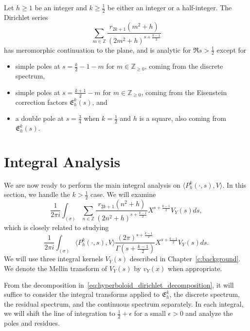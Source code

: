 \begin{theorem}\label{thm:hyperboloid:mero_summary}
  Let $h \geq 1$ be an integer and $k \geq \frac{1}{2}$ be either an integer or a
  half-integer.
  The Dirichlet series
  \begin{equation}
    \sum_{m \in \mathbb{Z}} \frac{r_{2k+1}(m^2 + h)}{(2m^2 + h)^{s + \frac{k-1}{2}}}
  \end{equation}
  has meromorphic continuation to the plane, and is analytic for $\Re s > \frac{1}{2}$
  except for
  \begin{itemize}
    \item simple poles at $s = \frac{k}{2} - 1 - m$ for $m \in \mathbb{Z}_{\geq 0}$,
      coming from the discrete spectrum,
    \item simple poles at $s = \frac{k+1}{2} - m$ for $m \in \mathbb{Z}_{\geq 0}$, coming
      from the Eisenstein correction factors $\mathfrak{E}_h^k(s)$, and
    \item a double pole at $s = \frac{3}{4}$ when $k = \frac{1}{2}$ and $h$ is a square,
      also coming from $\mathfrak{E}_h^k(s)$.
  \end{itemize}
\end{theorem}



\section{Integral Analysis}\label{sec:hyp:integral_analysis}

We are now ready to perform the main integral analysis on $\langle P_h^k(\cdot, s),
V\rangle$.
In this section, we handle the $k > \frac{1}{2}$ case.
We will examine
\begin{equation}
  \frac{1}{2\pi i} \int_{(\sigma)} \sum_{n \in \mathbb{Z}} \frac{r_{2k+1}(n^2 + h)}{(2n^2 +
  h)^{s + \frac{k-1}{2}}} X^{s+\frac{k-1}{2}} V_Y(s) ds,
\end{equation}
which is closely related to studying
\begin{equation}
  \frac{1}{2\pi i} \int_{(\sigma)} \langle P_h^k(\cdot, s), V \rangle \frac{(2\pi)^{s +
  \frac{k-1}{2}}}{\Gamma(s + \frac{k-1}{2})} X^{s+\frac{k-1}{2}} V_Y(s) ds.
\end{equation}
We will use three integral kernels $V_Y(s)$ described in Chapter~\ref{c:background}.
We denote the Mellin transform of $V_Y(s)$ by $v_Y(x)$ when appropriate.


From the decomposition in~\eqref{eq:hyperboloid_dirichlet_decomposition}, it will suffice
to consider the integral transforms applied to $\mathfrak{E}_h^k$, the discrete spectrum,
the residual spectrum, and the continuous spectrum separately.
In each integral, we will shift the line of integration to $\frac{1}{2} + \epsilon$ for a
small $\epsilon > 0$ and analyze the poles and residues.



